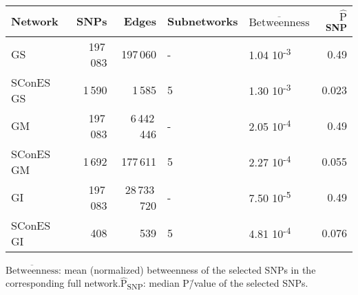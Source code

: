 \documentclass[twocolumn, 11pt]{article}
\newcommand{\mean}[1]{$\overline{\mbox{#1}}$}
\newcommand{\median}[1]{$\hat{\mbox{#1}}$}
\begin{document}
\onecolumn

\begin{table}[htbp]
\begin{threeparttable}
\centering
\begin{tabular}{lrrllr}
Network & SNPs & Edges & Subnetworks & \mean{Betweenness} & \median{P}\textsubscript{SNP}\\
\hline
GS & 197\,083 & 197\,060 & - & 1.04 \texttimes{} 10\textsuperscript{-3} & 0.49\\
SConES GS & 1\,590 & 1\,585 & 5 & 1.30 \texttimes{} 10\textsuperscript{-3} & 0.023\\
\hline
GM & 197\,083 & 6\,442\,446 & - & 2.05 \texttimes{} 10\textsuperscript{-4} & 0.49\\
SConES GM & 1\,692 & 177\,611 & 5 & 2.27 \texttimes{} 10\textsuperscript{-4} & 0.055\\
\hline
GI & 197\,083 & 28\,733\,720 & - & 7.50 \texttimes{} 10\textsuperscript{-5} & 0.49\\
SConES GI & 408 & 539 & 5 & 4.81 \texttimes{} 10\textsuperscript{-4} & 0.076\\
\end{tabular}
\begin{tablenotes}
  \footnotesize{
    \item \mean{Betweenness}: mean (normalized) betweenness of the selected SNPs in the corresponding full network.\median{P}\textsubscript{SNP}: median P\=/value of the selected SNPs.
  }
\end{tablenotes}
\end{threeparttable}
\end{table}
\end{document}
